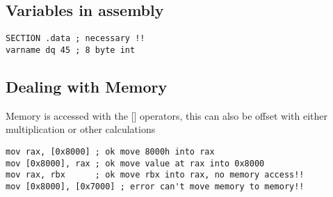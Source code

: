 \documentclass[main.tex,fontsize=8pt,paper=a4,paper=landscape,DIV=calc,]{scrartcl}
\begin{document}
\begin{multicols*}{4}
\subsection{Variables in assembly}
\vspace{-2.5mm}
\begin{lstlisting}
SECTION .data ; necessary !!
varname dq 45 ; 8 byte int
\end{lstlisting}
\vspace{2mm}

\subsection{Dealing with Memory}
Memory is accessed with the [] operators, this can also be offset with either multiplication or other calculations
\vspace{-2.5mm}
\begin{lstlisting}
mov rax, [0x8000] ; ok move 8000h into rax
mov [0x8000], rax ; ok move value at rax into 0x8000
mov rax, rbx      ; ok move rbx into rax, no memory access!!
mov [0x8000], [0x7000] ; error can't move memory to memory!!
\end{lstlisting}
\vspace{2mm}


\end{multicols*}
\end{document}
